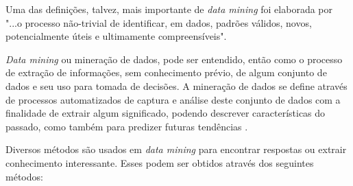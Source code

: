 Uma das definições, talvez, mais importante de \textit{data mining} foi elaborada por  "...o processo não-trivial de identificar, em dados, padrões válidos, novos, potencialmente úteis e ultimamente compreensíveis".

\textit{Data mining} ou mineração de dados, pode ser entendido, então como o processo de extração de informações, sem conhecimento prévio, de algum conjunto de dados e seu uso para tomada de decisões. A mineração de dados se define através de processos automatizados de captura e análise deste conjunto de dados com a finalidade de extrair algum significado, podendo descrever características do passado, como também para predizer futuras tendências \cite{conceito-data-mining}.

Diversos métodos são usados em \textit{data mining} para encontrar respostas ou extrair conhecimento interessante. Esses podem ser obtidos através dos seguintes métodos:

